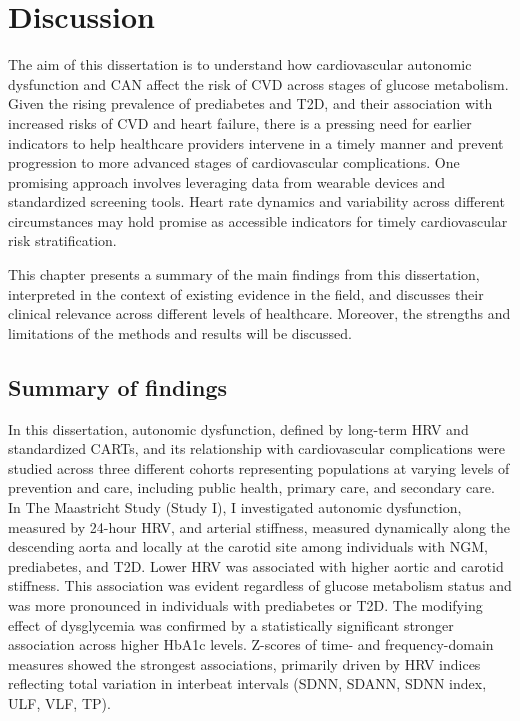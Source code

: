 \documentclass[
  letterpaper,
  headsepline=true,
  open=any]{scrbook}
\begin{document}

\hypertarget{discussion}{%
\chapter{Discussion}\label{discussion}}

\newpage

The aim of this dissertation is to understand how cardiovascular
autonomic dysfunction and CAN affect the risk of CVD across stages of
glucose metabolism. Given the rising prevalence of prediabetes and T2D,
and their association with increased risks of CVD and heart failure,
there is a pressing need for earlier indicators to help healthcare
providers intervene in a timely manner and prevent progression to more
advanced stages of cardiovascular complications. One promising approach
involves leveraging data from wearable devices and standardized
screening tools. Heart rate dynamics and variability across different
circumstances may hold promise as accessible indicators for timely
cardiovascular risk stratification.

This chapter presents a summary of the main findings from this
dissertation, interpreted in the context of existing evidence in the
field, and discusses their clinical relevance across different levels of
healthcare. Moreover, the strengths and limitations of the methods and
results will be discussed.

\newpage

\hypertarget{summary-of-findings}{%
\section{Summary of findings}\label{summary-of-findings}}

In this dissertation, autonomic dysfunction, defined by long-term HRV
and standardized CARTs, and its relationship with cardiovascular
complications were studied across three different cohorts representing
populations at varying levels of prevention and care, including public
health, primary care, and secondary care. In The Maastricht Study (Study
I), I investigated autonomic dysfunction, measured by 24-hour HRV, and
arterial stiffness, measured dynamically along the descending aorta and
locally at the carotid site among individuals with NGM, prediabetes, and
T2D. Lower HRV was associated with higher aortic and carotid stiffness.
This association was evident regardless of glucose metabolism status and
was more pronounced in individuals with prediabetes or T2D. The
modifying effect of dysglycemia was confirmed by a statistically
significant stronger association across higher HbA1c levels. Z-scores of
time- and frequency-domain measures showed the strongest associations,
primarily driven by HRV indices reflecting total variation in interbeat
intervals (SDNN, SDANN, SDNN index, ULF, VLF, TP).
\end{document}
